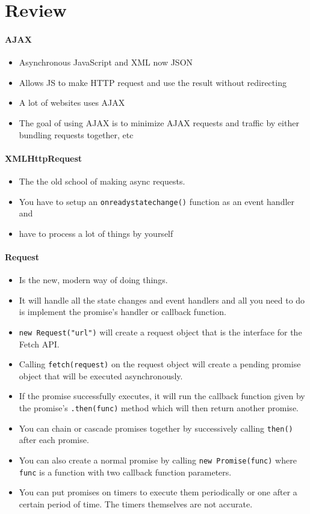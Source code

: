 \documentclass[../CMPUT-404-Notes.tex]{subfiles}
\begin{document}
\section{Review}
\paragraph{AJAX}
\begin{itemize}
  \item Asynchronous JavaScript and XML now JSON
  \item Allows JS to make HTTP request and use the result without redirecting
  \item A lot of websites uses AJAX
  \item The goal of using AJAX is to minimize AJAX requests and traffic by either bundling requests together, etc
\end{itemize}
\paragraph{XMLHttpRequest}
\begin{itemize}
  \item The the old school of making async requests. 
  \item You have to setup an \texttt{onreadystatechange()} function as an event handler and
  \item have to process a lot of things by yourself  
\end{itemize}
\paragraph{Request}
\begin{itemize}
  \item Is the new, modern way of doing things. 
  \item It will handle all the state changes and event handlers and all you need to do is implement the promise's handler or callback function. 
  \item \texttt{new Request("url")} will create a request object that is the interface for the Fetch API. 
  \item Calling \texttt{fetch(request)} on the request object will create a pending promise object that will be executed asynchronously.
  \item If the promise successfully executes, it will run the callback function given by the promise's \texttt{.then(func)} method which will then return another promise.
  \item You can chain or cascade promises together by successively calling \texttt{then()} after each promise.
  \item You can also create a normal promise by calling \texttt{new Promise(func)} where \texttt{func} is a function with two callback function parameters.    
  \item You can put promises on timers to execute them periodically or one after a certain period of time. The timers themselves are not accurate. 
\end{itemize}
\end{document}
